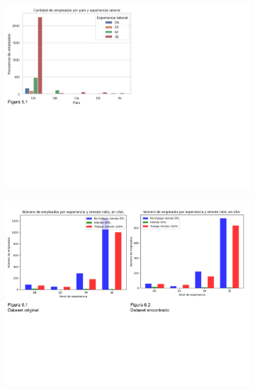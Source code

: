 \documentclass{article}
\begin{document}
	\begin{figure}[htbp] %
		\begin{subfigure}[b]{1.1\textwidth}
			\includegraphics[width=20cm]{FigurasTablas/figura5.1graficabarras.png}
			\label{figura 5.1 grafico de barras agrupado}
		\end{subfigure}
		
		\begin{subfigure}[b]{1.1\textwidth}
			\includegraphics[width=15cm]{FigurasTablas/figura6.1y6.2GraficoBarras.png}
			\label{figura7.1y7.2GraficoBarras}
		\end{subfigure}
	\end{figure}
\end{document}
